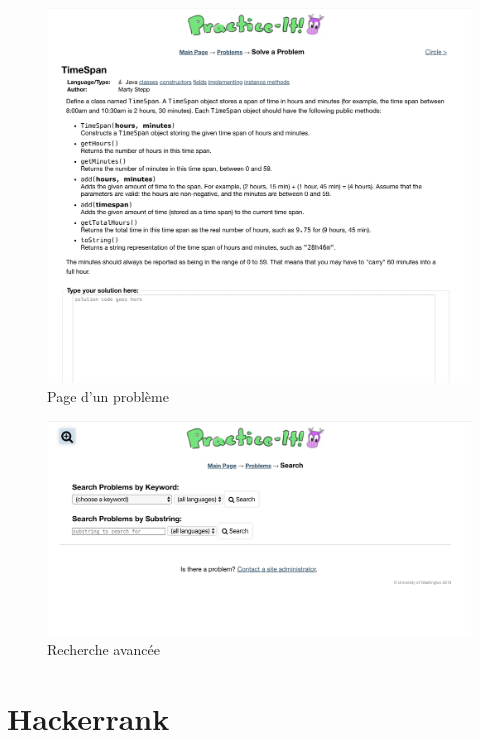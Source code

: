 \begin{figure}[H]
    \includegraphics[width=\textwidth,height=0.56\textheight,keepaspectratio]{images/comparison/practice-it-2.png}
    \centering
    \caption[Practice-it : page d'un problème]{Page d'un problème}
\end{figure}

\begin{figure}[H]
    \includegraphics[width=\textwidth,height=0.35\textheight,keepaspectratio]{images/comparison/practice-it-3.png}
    \centering
    \caption[Practice-it : recherche avancée]{Recherche avancée}
\end{figure}

\section{Hackerrank}

